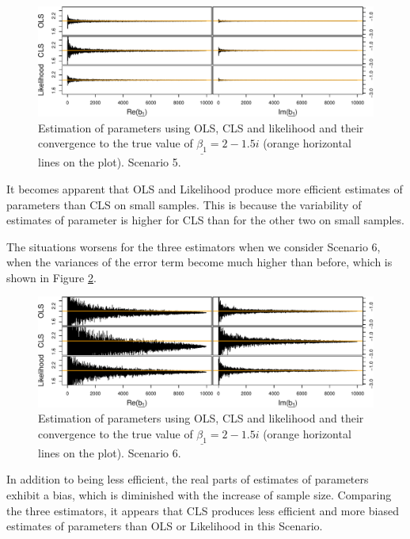 \documentclass[
]{book}
\begin{document}
\begin{figure}
\centering
\includegraphics{Svetunkov---Svetunkov---Complex-Dynamic-Models_files/figure-latex/parametersCorError-1.pdf}
\caption{\label{fig:parametersCorError}Estimation of parameters using OLS, CLS and likelihood and their convergence to the true value of \(\underline{\beta_1}=2-1.5i\) (orange horizontal lines on the plot). Scenario 5.}
\end{figure}

It becomes apparent that OLS and Likelihood produce more efficient estimates of parameters than CLS on small samples. This is because the variability of estimates of parameter is higher for CLS than for the other two on small samples.

The situations worsens for the three estimators when we consider Scenario 6, when the variances of the error term become much higher than before, which is shown in Figure \ref{fig:parametersHVError}.

\begin{figure}
\centering
\includegraphics{Svetunkov---Svetunkov---Complex-Dynamic-Models_files/figure-latex/parametersHVError-1.pdf}
\caption{\label{fig:parametersHVError}Estimation of parameters using OLS, CLS and likelihood and their convergence to the true value of \(\underline{\beta_1}=2-1.5i\) (orange horizontal lines on the plot). Scenario 6.}
\end{figure}

In addition to being less efficient, the real parts of estimates of parameters exhibit a bias, which is diminished with the increase of sample size. Comparing the three estimators, it appears that CLS produces less efficient and more biased estimates of parameters than OLS or Likelihood in this Scenario.
\end{document}

